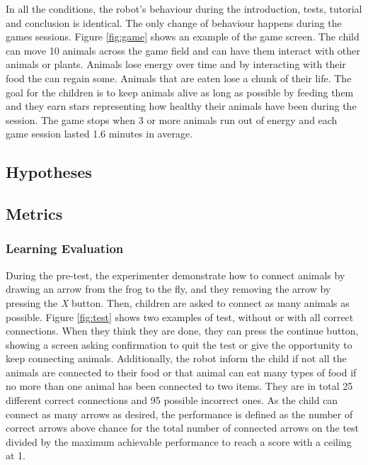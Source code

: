 In all the conditions, the robot's behaviour during the introduction, tests, tutorial and conclusion is identical. The only change of behaviour happens during the games sessions. Figure \ref{fig:game} shows an example of the game screen. The child can move 10 animals across the game field and can have them interact with other animals or plants. Animals lose energy over time and by interacting with their food the can regain some. Animals that are eaten lose a chunk of their life. The goal for the children is to keep animals alive as long as possible by feeding them and they earn stars representing how healthy their animals have been during the session. The game stops when 3 or more animals run out of energy and each game session lasted 1.6 minutes in average.

\subsection{Hypotheses}

\subsection{Metrics}
\subsubsection{Learning Evaluation}
During the pre-test, the experimenter demonstrate how to connect animals by drawing an arrow from the frog to the fly, and they removing the arrow by pressing the \textit{X} button. Then, children are asked to connect as many animals as possible. Figure \ref{fig:test} shows two examples of test, without or with all correct connections. When they think they are done, they can press the continue button, showing a screen asking confirmation to quit the test or give the opportunity to keep connecting animals. Additionally, the robot inform the child if not all the animals are connected to their food or that animal can eat many types of food if no more than one animal has been connected to two items. They are in total 25 different correct connections and 95 possible incorrect ones. As the child can connect as many arrows as desired, the performance is defined as the number of correct arrows above chance for the total number of connected arrows on the test divided by the maximum achievable performance to reach a score with a ceiling at 1.

